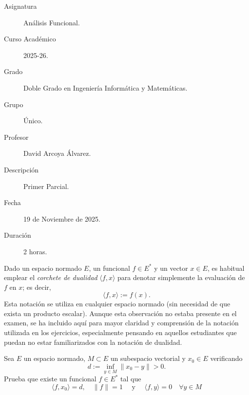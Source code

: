 \documentclass[12pt]{article}
\newcommand{\norma}[1]{\lVert #1 \rVert}
\newcommand{\dual}[1]{#1^{*}}
\newcommand{\prodescalar}[2]{\langle #1, #2 \rangle}
\begin{document}

    
    

    \begin{description}
        \item[Asignatura] Análisis Funcional.
        \item[Curso Académico] 2025-26.
        \item[Grado] Doble Grado en Ingeniería Informática y Matemáticas.
        \item[Grupo] Único.
        \item[Profesor] David Arcoya Álvarez.
        \item[Descripción] Primer Parcial.
        \item[Fecha] 19 de Noviembre de 2025.
        \item[Duración] 2 horas.
    
    \end{description}
    \newpage


    \begin{observacion}
        Dado un espacio normado $E$, un funcional $f \in E^\ast$ y un vector $x \in E$, es habitual emplear el \emph{corchete de dualidad} $\langle f, x \rangle$ para denotar simplemente la evaluación de $f$ en $x$; es decir,
        \begin{equation*}
            \langle f, x \rangle := f(x).
        \end{equation*}
        Esta notación se utiliza en cualquier espacio normado (sin necesidad de que exista un producto escalar). Aunque esta observación no estaba presente en el examen, se ha incluido aquí para mayor claridad y comprensión de la notación utilizada en los ejercicios, especialmente pensando en aquellos estudiantes que puedan no estar familiarizados con la notación de dualidad.
    \end{observacion}
    
    \begin{ejercicio}[3.5 Puntos]
        Sea $E$ un espacio normado, $M \subset E$ un subespacio vectorial y $x_0 \in E$ verificando
        $$d:= \inf_{y \in M} \norma{x_0 - y} > 0.$$
        Prueba que existe un funcional $f \in \dual{E}$ tal que 
        $$\prodescalar{f}{x_0} = d, \quad \norma{f} = 1 \quad \text{ y } \quad \prodescalar{f}{y} = 0 \quad \forall y \in M$$
    \end{ejercicio}
\end{document}
